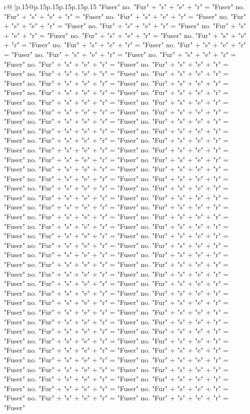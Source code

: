 \documentclass{article}
\begin{document}
{\begin{supertabular}{c@{$\;$}|p{.15\linewidth}@{}p{.15\linewidth}p{.15\linewidth}p{.15\linewidth}p{.15\linewidth}p{.15\linewidth}}
{{{"Fuser" no. "Fur" + "s" + "e" + "r" = "Fuser" no. "Fur" + "s" + "e" + "r" = "Fuser" no. "Fur" + "s" + "e" + "r" = "Fuser" no. "Fur" + "s" + "e" + "r" = "Fuser" no. "Fur" + "s" + "e" + "r" = "Fuser" no. "Fur" + "s" + "e" + "r" = "Fuser" no. "Fur" + "s" + "e" + "r" = "Fuser" no. "Fur" + "s" + "e" + "r" = "Fuser" no. "Fur" + "s" + "e" + "r" = "Fuser" no. "Fur" + "s" + "e" + "r" = "Fuser" no. "Fur" + "s" + "e" + "r" = "Fuser" no. "Fur" + "s" + "e" + "r" = "Fuser" no. "Fur" + "s" + "e" + "r" = "Fuser" no. "Fur" + "s" + "e" + "r" = "Fuser" no. "Fur" + "s" + "e" + "r" = "Fuser" no. "Fur" + "s" + "e" + "r" = "Fuser" no. "Fur" + "s" + "e" + "r" = "Fuser" no. "Fur" + "s" + "e" + "r" = "Fuser" no. "Fur" + "s" + "e" + "r" = "Fuser" no. "Fur" + "s" + "e" + "r" = "Fuser" no. "Fur" + "s" + "e" + "r" = "Fuser" no. "Fur" + "s" + "e" + "r" = "Fuser" no. "Fur" + "s" + "e" + "r" = "Fuser" no. "Fur" + "s" + "e" + "r" = "Fuser" no. "Fur" + "s" + "e" + "r" = "Fuser" no. "Fur" + "s" + "e" + "r" = "Fuser" no. "Fur" + "s" + "e" + "r" = "Fuser" no. "Fur" + "s" + "e" + "r" = "Fuser" no. "Fur" + "s" + "e" + "r" = "Fuser" no. "Fur" + "s" + "e" + "r" = "Fuser" no. "Fur" + "s" + "e" + "r" = "Fuser" no. "Fur" + "s" + "e" + "r" = "Fuser" no. "Fur" + "s" + "e" + "r" = "Fuser" no. "Fur" + "s" + "e" + "r" = "Fuser" no. "Fur" + "s" + "e" + "r" = "Fuser" no. "Fur" + "s" + "e" + "r" = "Fuser" no. "Fur" + "s" + "e" + "r" = "Fuser" no. "Fur" + "s" + "e" + "r" = "Fuser" no. "Fur" + "s" + "e" + "r" = "Fuser" no. "Fur" + "s" + "e" + "r" = "Fuser" no. "Fur" + "s" + "e" + "r" = "Fuser" no. "Fur" + "s" + "e" + "r" = "Fuser" no. "Fur" + "s" + "e" + "r" = "Fuser" no. "Fur" + "s" + "e" + "r" = "Fuser" no. "Fur" + "s" + "e" + "r" = "Fuser" no. "Fur" + "s" + "e" + "r" = "Fuser" no. "Fur" + "s" + "e" + "r" = "Fuser" no. "Fur" + "s" + "e" + "r" = "Fuser" no. "Fur" + "s" + "e" + "r" = "Fuser" no. "Fur" + "s" + "e" + "r" = "Fuser" no. "Fur" + "s" + "e" + "r" = "Fuser" no. "Fur" + "s" + "e" + "r" = "Fuser" no. "Fur" + "s" + "e" + "r" = "Fuser" no. "Fur" + "s" + "e" + "r" = "Fuser" no. "Fur" + "s" + "e" + "r" = "Fuser" no. "Fur" + "s" + "e" + "r" = "Fuser" no. "Fur" + "s" + "e" + "r" = "Fuser" no. "Fur" + "s" + "e" + "r" = "Fuser" no. "Fur" + "s" + "e" + "r" = "Fuser" no. "Fur" + "s" + "e" + "r" = "Fuser" no. "Fur" + "s" + "e" + "r" = "Fuser" no. "Fur" + "s" + "e" + "r" = "Fuser" no. "Fur" + "s" + "e" + "r" = "Fuser" no. "Fur" + "s" + "e" + "r" = "Fuser" no. "Fur" + "s" + "e" + "r" = "Fuser" no. "Fur" + "s" + "e" + "r" = "Fuser" no. "Fur" + "s" + "e" + "r" = "Fuser" no. "Fur" + "s" + "e" + "r" = "Fuser" no. "Fur" + "s" + "e" + "r" = "Fuser" no. "Fur" + "s" + "e" + "r" = "Fuser" no. "Fur" + "s" + "e" + "r" = "Fuser" no. "Fur" + "s" + "e" + "r" = "Fuser" no. "Fur" + "s" + "e" + "r" = "Fuser" no. "Fur" + "s" + "e" + "r" = "Fuser" no. "Fur" + "s" + "e" + "r" = "Fuser" no. "Fur" + "s" + "e" + "r" = "Fuser" no. "Fur" + "s" + "e" + "r" = "Fuser" no. "Fur" + "s" + "e" + "r" = "Fuser" no. "Fur" + "s" + "e" + "r" = "Fuser" no. "Fur" + "s" + "e" + "r" = "Fuser" no. "Fur" + "s" + "e" + "r" = "Fuser" no. "Fur" + "s" + "e" + "r" = "Fuser" no. "Fur" + "s" + "e" + "r" = "Fuser" no. "Fur" + "s" + "e" + "r" = "Fuser" }}}
\end{supertabular}}
\end{document}
